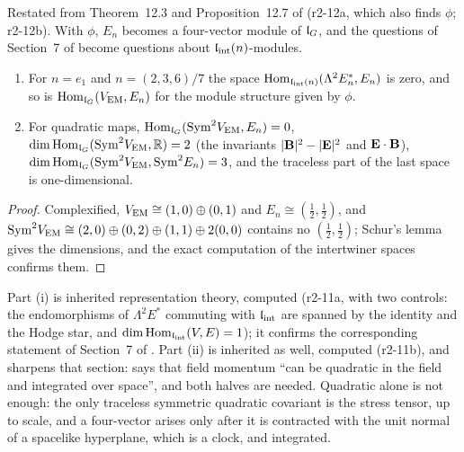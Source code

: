 Restated from Theorem~12.3 and Proposition~12.7 of \cite{ES17} (r2-12a, which also finds $\phi$; r2-12b). With $\phi$, $E_n$ becomes a four-vector module of
$\mathfrak l_G$, and the questions of Section~7 of \cite{FMB} become questions about $\mathfrak l_{\rm int}(n)$-modules.

\begin{proposition}
\label{r2:prop:nolinear}
\begin{enumerate}[label=(\roman*),leftmargin=2.2em]
\item For $n=e_1$ and $n=(2,3,6)/7$ the space $\operatorname{Hom}_{\mathfrak l_{\rm int}(n)}(\Lambda^2E_n^*,E_n)$ is zero, and so is $\operatorname{Hom}_{\mathfrak l_G}(V_{\rm EM},E_n)$ for the module
structure given by $\phi$.
\item For quadratic maps, $\operatorname{Hom}_{\mathfrak l_G}(\mathrm{Sym}^2V_{\rm EM},E_n)=0$, $\dim\operatorname{Hom}_{\mathfrak l_G}(\mathrm{Sym}^2V_{\rm EM},\mathbb{R})=2$ (the invariants $|\mathbf B|^2-|\mathbf E|^2$ and
$\mathbf E\cdot\mathbf B$), $\dim\operatorname{Hom}_{\mathfrak l_G}(\mathrm{Sym}^2V_{\rm EM},\mathrm{Sym}^2E_n)=3$, and the traceless part of the last space is one-dimensional.
\end{enumerate}
\end{proposition}

\begin{proof}
Complexified, $V_{\rm EM}\cong(1,0)\oplus(0,1)$ and $E_n\cong(\tfrac12,\tfrac12)$, and $\mathrm{Sym}^2V_{\rm EM}\cong(2,0)\oplus(0,2)\oplus(1,1)\oplus2(0,0)$
contains no $(\tfrac12,\tfrac12)$; Schur's lemma \cite{GoodmanWallach} gives the dimensions, and the exact computation of the intertwiner spaces
confirms them.
\end{proof}

Part (i) is inherited representation theory, computed (r2-11a, with two controls: the endomorphisms of $\Lambda^2E^*$ commuting with $\mathfrak l_{\rm int}$ are spanned by the identity
and the Hodge star, and $\dim\operatorname{Hom}_{\mathfrak l_{\rm int}}(V,E)=1$); it confirms the corresponding statement of Section~7 of \cite{FMB}. Part (ii) is inherited as well,
computed (r2-11b), and sharpens that section: \cite{FMB} says that field momentum ``can be quadratic in the field and integrated over space'', and both
halves are needed. Quadratic alone is not enough: the only traceless symmetric quadratic covariant is the stress tensor, up to scale, and a four-vector arises only after it is
contracted with the unit normal of a spacelike hyperplane, which is a clock, and integrated.

